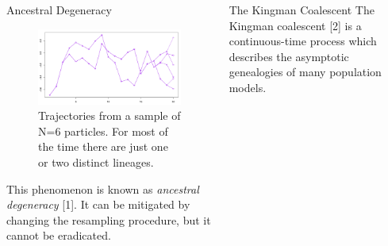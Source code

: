 \documentclass[final, 12pt]{beamer}
\newlength{\colwidth}
\begin{document}
\begin{frame}
\begin{columns}
\begin{column}{\colwidth}
\begin{block}{Ancestral Degeneracy}
\begin{figure} %
\includegraphics[width=0.9\colwidth]{degeneracy.pdf}
\caption{Trajectories from a sample of N=6 particles. For most of the time there are just one or two distinct lineages.}
\end{figure}

This phenomenon is known as \emph{ancestral degeneracy} [1]. It can be mitigated by changing the resampling procedure, but it cannot be eradicated.
\end{block}
\end{column}

\begin{column}{\colwidth}

\vspace*{-80pt}

\begin{block}{The Kingman Coalescent}
The Kingman coalescent [2] is a continuous-time process which describes the asymptotic genealogies of many population models.\\[10pt]


\end{block}
\end{column}
\end{columns}
\end{frame}
\end{document}
